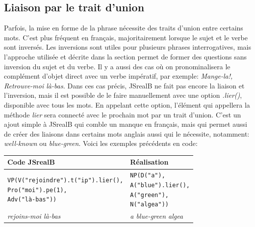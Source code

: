 \documentclass[11pt]{article} %
\newcommand{\system}[1]{\textsf{#1}}
\newcommand{\JSB}{\system{JSrealB}}
\newcommand{\real}[1]{\emph{#1}}
\begin{document}
\subsection{Liaison par le trait d'union}
Parfois, la mise en forme de
la phrase nécessite des traits d'union entre certains mots. C'est
plus fréquent en français, majoritairement lorsque le sujet et le
verbe sont inversés.  Les inversions sont utiles pour plusieurs phrases
interrogatives, mais l'approche utilisée et décrite dans la section \hyperref[question]{}
 permet de former des questions sans inversion du sujet
et du verbe. Il y a aussi des cas où on pronominalisera le complément
d'objet direct avec un verbe impératif, par exemple: \emph{Mange-la!,
Retrouve-moi là-bas. }Dans ces cas précis, \JSB{} ne fait pas encore
la liaison et l'inversion, mais il est possible de le faire manuellement
avec une option \emph{.lier()}, disponible avec tous les mots. En
appelant cette option, l'élément qui appellera la méthode \emph{lier}
sera connecté avec le prochain mot par un trait d'union. C'est un
ajout simple à \JSB{} qui comble un manque en français, mais qui
permet aussi de créer des liaisons dans certains mots anglais aussi
qui le nécessite, notamment: \emph{well-known} ou \emph{blue-green}. Voici les exemples
précédents en code:
\begin{tabular}{|p{7cm}|p{7cm}|}
\hline 
Code \JSB{} & Réalisation\\
\hline 
\hline
\begin{alltt}
VP(V("rejoindre").t("ip").lier(),
   Pro("moi").pe(1),
   Adv("là-bas"))
\end{alltt} &
\begin{alltt}
NP(D("a"),
   A("blue").lier(),
   A("green"),
   N("algea"))
\end{alltt} \\
\hline 
\real{rejoins-moi là-bas} & \real{a blue-green algea}\\
\hline 
\end{tabular}
\end{document}
